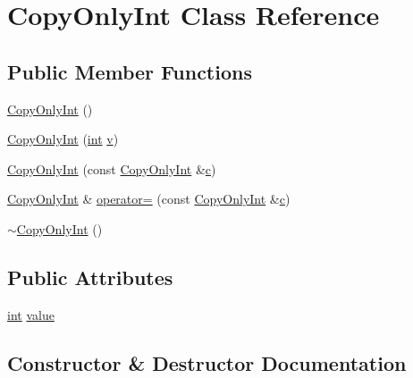 \hypertarget{class_copy_only_int}{}\section{Copy\+Only\+Int Class Reference}
\label{class_copy_only_int}
\subsection*{Public Member Functions}
\begin{DoxyCompactItemize}
\item 
\mbox{\hyperlink{class_copy_only_int_a16414abdf4341f158de20cb886a7f96b}{Copy\+Only\+Int}} ()
\item 
\mbox{\hyperlink{class_copy_only_int_a9c3ff4a3354d0435614968d3cb9e119a}{Copy\+Only\+Int}} (\mbox{\hyperlink{warnings_8h_a74f207b5aa4ba51c3a2ad59b219a423b}{int}} \mbox{\hyperlink{_s_d_l__opengl_8h_a10a82eabcb59d2fcd74acee063775f90}{v}})
\item 
\mbox{\hyperlink{class_copy_only_int_a12cee121cc53e400dd1b6c642659ab13}{Copy\+Only\+Int}} (const \mbox{\hyperlink{class_copy_only_int}{Copy\+Only\+Int}} \&\mbox{\hyperlink{_s_d_l__opengl__glext_8h_a1f2d7f8147412c43ba2303a56f97ee73}{c}})
\item 
\mbox{\hyperlink{class_copy_only_int}{Copy\+Only\+Int}} \& \mbox{\hyperlink{class_copy_only_int_ad526a5d5ea44fe82010193665a6d1102}{operator=}} (const \mbox{\hyperlink{class_copy_only_int}{Copy\+Only\+Int}} \&\mbox{\hyperlink{_s_d_l__opengl__glext_8h_a1f2d7f8147412c43ba2303a56f97ee73}{c}})
\item 
\mbox{\hyperlink{class_copy_only_int_a70c6966c7ce0f9198334a59b88222995}{$\sim$\+Copy\+Only\+Int}} ()
\end{DoxyCompactItemize}
\subsection*{Public Attributes}
\begin{DoxyCompactItemize}
\item 
\mbox{\hyperlink{warnings_8h_a74f207b5aa4ba51c3a2ad59b219a423b}{int}} \mbox{\hyperlink{class_copy_only_int_a80532b35315d29ab0c1b20c1a06e8506}{value}}
\end{DoxyCompactItemize}


\subsection{Constructor \& Destructor Documentation}
\mbox{\label{class_copy_only_int_a16414abdf4341f158de20cb886a7f96b}} 
